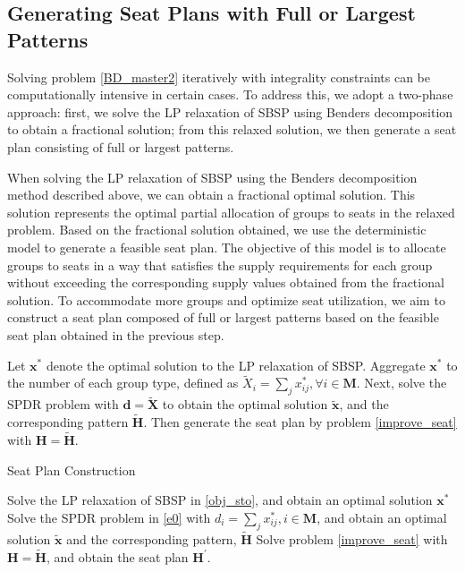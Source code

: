 \subsection{Generating Seat Plans with Full or Largest Patterns}\label{seat_assignment}
Solving problem \eqref{BD_master2} iteratively with integrality constraints can be computationally intensive in certain cases. To address this, we adopt a two-phase approach: first, we solve the LP relaxation of SBSP using Benders decomposition to obtain a fractional solution; from this relaxed solution, we then generate a seat plan consisting of full or largest patterns.

When solving the LP relaxation of SBSP using the Benders decomposition method described above, we can obtain a fractional optimal solution. This solution represents the optimal partial allocation of groups to seats in the relaxed problem. Based on the fractional solution obtained, we use the deterministic model to generate a feasible seat plan. The objective of this model is to allocate groups to seats in a way that satisfies the supply requirements for each group without exceeding the corresponding supply values obtained from the fractional solution. To accommodate more groups and optimize seat utilization, we aim to construct a seat plan composed of full or largest patterns based on the feasible seat plan obtained in the previous step.


Let $\mathbf{x}^{*}$ denote the optimal solution to the LP relaxation of SBSP. Aggregate $\mathbf{x}^{*}$ to the number of each group type, defined as $\tilde{X}_{i} =\sum_{j} x^{*}_{ij}, \forall i \in \mathbf{M}$. Next, solve the SPDR problem with $\bm{d} = \bm{\tilde{X}}$ to obtain the optimal solution $\mathbf{\tilde{x}}$, and the corresponding pattern $\tilde{\bm{H}}$. Then generate the seat plan by problem \eqref{improve_seat} with $\bm{H}=  \tilde{\bm{H}}$.


\begin{algorithm}
  \caption{Seat Plan Construction}\label{seat_construction}
    {Solve the LP relaxation of SBSP in \eqref{obj_sto}, and obtain an optimal solution $\mathbf{x}^{*}$\;}
    {Solve the SPDR problem in \eqref{e0} with $d_{i} = \sum_{j} x^{*}_{ij}, i \in \mathbf{M}$, and obtain an optimal solution $\tilde{\mathbf{x}}$ and the corresponding pattern, $\tilde{\bm{H}}$\;}
    {Solve problem \eqref{improve_seat} with $\bm{H} = \tilde{\bm{H}}$, and obtain the seat plan $\bm{H}^{\prime}$.}
\end{algorithm}

